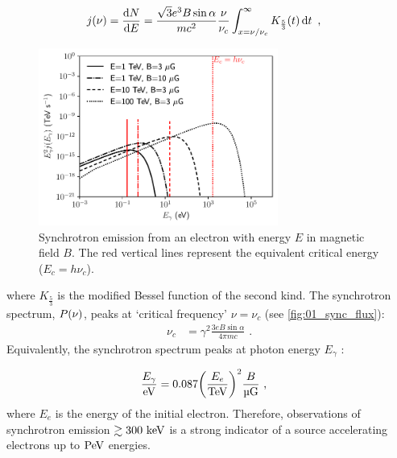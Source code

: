 \begin{equation}
    \begin{aligned}
    j \qty(\nu)&=\dv{N}{E}=\frac{\sqrt{3}e^3B\sin\alpha}{mc^2}\frac{\nu}{\nu_c}\int_{x=\nu/\nu_c}^{\infty}K_\frac{5}{3}\qty(t)\dd{t}\text{ ,}
    \end{aligned} \label{eq:01_nontherm_sync_indiv}
\end{equation}
\begin{figure}
    \centering
    \includegraphics[width=0.7\textwidth]{04_Introduction/Images/non_thermal_emission/synchrotron_spectrum.pdf}
    \caption{Synchrotron emission from an electron with energy $E$ in magnetic field $B$. The red vertical lines represent the equivalent critical energy ($E_c=h\nu_c$).}
    \label{fig:01_sync_flux}
\end{figure}
\noindent where $K_\frac{5}{3}$ is the modified Bessel function of the second kind. The synchrotron spectrum, $P\qty(\nu)$, peaks at `critical frequency' $\nu=\nu_c$ (see \autoref{fig:01_sync_flux}):
\begin{equation}
    \begin{aligned}
    \nu_c&=\gamma^2\frac{3eB\sin\alpha}{4\pi mc}\text{ .}
    \end{aligned}
\end{equation}
\noindent Equivalently, the synchrotron spectrum peaks at photon energy $E_\gamma$ \citep{2009ARA&A..47..523H}:

\begin{equation}
    \begin{aligned}
    \frac{E_\gamma}{\eV}&=0.087 \qty(\frac{E_e}{\TeV})^2 \frac{B}{\si{\micro G}}\text{ ,}
    \end{aligned}
\end{equation}
\noindent where $E_e$ is the energy of the initial electron. Therefore, observations of synchrotron emission $\gtrsim 300~\si{\kilo\electronvolt}$ is a strong indicator of a source accelerating electrons up to $\PeV$ energies.


